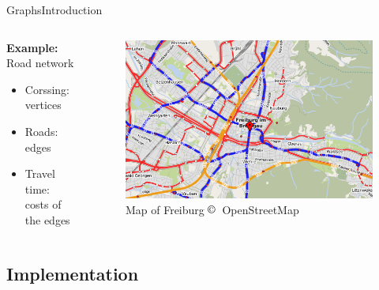 \begin{frame}{Graphs}{Introduction}
  \begin{columns}
    \begin{column}{0.40\linewidth}
      \textbf{Example:} Road network
      \begin{itemize}
        \item<2->
          Corssing: {\color{Mittel-Blau}vertices}
        \item<3->
          Roads: {\color{Mittel-Blau}edges}
        \item<4->
          Travel time:\\
          {\color{Mittel-Blau}costs of the edges}
      \end{itemize}
    \end{column}
    \begin{column}{0.6\linewidth}
      \begin{figure}[!h]
        \includegraphics[width=\linewidth]
          {Images/Graphs/Freiburg_OpenStreetMap.png}
        \caption{Map of Freiburg $\copyright$~OpenStreetMap}
        \label{fig:graphs:introduction_freiburg_osm}
      \end{figure}
    \end{column}
  \end{columns}
\end{frame}



\subsection{Implementation}

